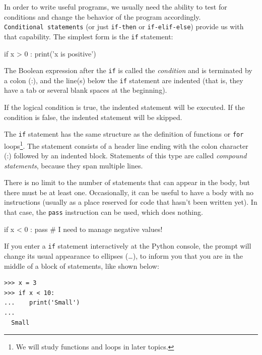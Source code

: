 In order to write useful programs, we usually need the ability to test for conditions and change the behavior of the program accordingly. \texttt{Conditional\ statements} (or just \texttt{if-then} or \texttt{if-elif-else}) provide us with that capability. The simplest form is the \texttt{if} statement:

\begin{python}[frame=single]
if x > 0 :
    print('x is positive')
\end{python}

The Boolean expression after the \texttt{if} is called the \emph{condition} and is terminated by a colon (:), and the line(s) below the \texttt{if} statement are indented (that is, they have a tab or several blank spaces at the beginning).

If the logical condition is true, the indented statement will be executed. If the condition is false, the indented statement will be skipped.

 

The \texttt{if} statement has the same structure as the definition
of functions or \texttt{for} loops\footnote{We will study functions and loops in later topics.}. The statement consists of a header line ending with the colon character (:) followed by an indented block. Statements of this type are called \emph{compound statements}, because
they span multiple lines.

There is no limit to the number of statements that can appear in the
body, but there must be at least one. Occasionally, it can be useful to have a body with no instructions (usually as a place reserved for code that hasn't been written yet). In that case, the \texttt{pass} instruction can be used, which does nothing.

 

\begin{python}[frame=single]
if x < 0 :
    pass          # I need to manage negative values!
\end{python}

If you enter a \texttt{if} statement interactively at the Python console, the prompt will change its usual appearance to ellipses (\emph{\ldots{}}), to inform you that you are in the middle of a block of statements, like shown below:


\begin{Verbatim}[frame=single]
>>> x = 3
>>> if x < 10:
...    print('Small')
...
  Small
\end{Verbatim}

